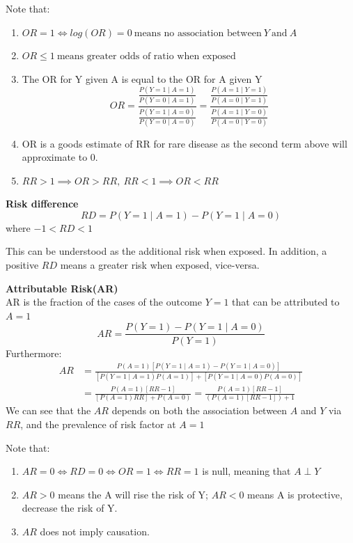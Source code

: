 Note that:
\begin{enumerate}
    \item $OR=1\Leftrightarrow log(OR)=0\:\text{means no association between}\:Y\:\text{and}\:A$
    \item $OR\leq 1\:\text{means greater odds of ratio when exposed}$
    \item The OR for Y given A is equal to the OR for A given Y$$
    OR=\frac{\frac{P(Y=1 \mid A=1)}{P(Y=0 \mid A=1)}}{\frac{P(Y=1 \mid A=0)}{P(Y=0 \mid A=0)}}=\frac{\frac{P(A=1 \mid Y=1)}{P(A=0 \mid Y=1)}}{\frac{P(A=1 \mid Y=0)}{P(A=0 \mid Y=0)}}
    $$
    \item OR is a goods estimate of RR for rare disease as the second term above will approximate to 0.
    \item $RR>1\implies OR>RR,\:RR<1\implies OR<RR$
\end{enumerate}
\begin{definition}
    \textbf{Risk difference}\\
    $$
    RD=P(Y=1 \mid A=1)-P(Y=1 \mid A=0)
    $$
    where $-1<RD<1$
\end{definition}
This can be understood as the additional risk when exposed. In addition, a positive $RD$ means a greater risk when exposed, vice-versa.
\begin{definition}
    \textbf{Attributable Risk(AR)}\\
    AR is the fraction of the cases of the outcome $Y=1$ that can be attributed to $A=1$
    $$
    AR=\frac{P(Y=1)-P(Y=1 \mid A=0)}{P(Y=1)}
    $$
    Furthermore:
    \begin{align*}
    AR&=\frac{P(A=1)[P(Y=1 \mid A=1)-P(Y=1 \mid A=0)]}{[P(Y=1 \mid A=1) P(A=1)]+[P(Y=1 \mid A=0) P(A=0)]}\\
    &=\frac{P(A=1)[R R-1]}{[P(A=1) R R]+P(A=0)}=\frac{P(A=1)[R R-1]}{(P(A=1)[R R-1])+1}
    \end{align*}
    We can see that the $AR$ depends on both the association between $A$ and $Y$ via $RR$, and the prevalence of risk factor at $A=1$
\end{definition}
Note that:
\begin{enumerate}
    \item $ AR=0 \Longleftrightarrow RD=0 \Longleftrightarrow O R=1 \Longleftrightarrow R R=1 $ is null, meaning that $A\perp Y$
    \item $AR>0$ means the A will rise the risk of Y; $AR<0$ means A is protective, decrease the risk of Y.
    \item $AR$ does not imply causation.
\end{enumerate}
